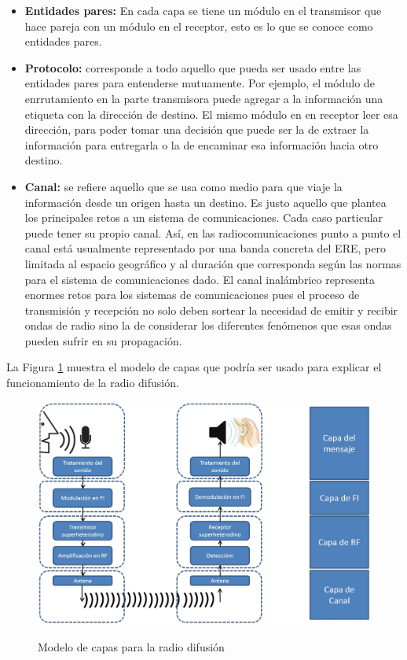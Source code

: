 \begin{itemize}
	\item  \textbf{Entidades pares:} En cada capa se tiene un módulo en el transmisor que hace pareja con un módulo en el receptor, esto es lo que se conoce como entidades pares.
    \item  \textbf{Protocolo:} corresponde a todo aquello que pueda ser usado entre las entidades pares para entenderse mutuamente. Por ejemplo, el módulo de enrrutamiento en la parte transmisora puede agregar a la información una etiqueta con la dirección de destino. El mismo módulo en en receptor leer esa dirección, para poder tomar una decisión que puede ser la de extraer la información para entregarla o la de encaminar esa información hacia otro destino.
    \item  \textbf{Canal:} se refiere aquello que se usa como medio para que viaje la información desde un origen hasta un destino. Es justo aquello que plantea los principales retos a un sistema de comunicaciones. Cada caso particular puede tener su propio canal. Así, en las radiocomunicaciones punto a punto el canal está usualmente representado por una banda concreta del ERE, pero limitada al espacio geográfico y al duración que corresponda según las normas para el sistema de comunicaciones dado. El canal inalámbrico representa enormes retos para los sistemas de comunicaciones pues el proceso de transmisión y recepción no solo deben sortear la necesidad de emitir y recibir ondas de radio sino la de considerar los diferentes fenómenos que esas ondas pueden sufrir en su propagación. 
\end{itemize}

La Figura \ref{fig:ModeloRadiodifusion} muestra el modelo de capas que podría ser usado para explicar el funcionamiento de la radio difusión. \\

\vspace{300px}
\begin{figure}[h!]
	\captionsetup{justification = raggedright, singlelinecheck = false}
	\caption{Modelo de capas para la radio difusión} 
	\centering
	\includegraphics[scale=0.4]{Imagenes/ModeloRadiodifusion}
	\label{fig:ModeloRadiodifusion}
\end{figure}


